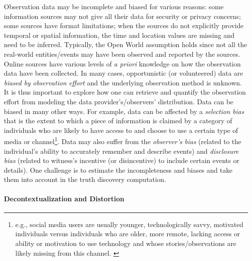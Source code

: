 \documentclass[prodmode,acmtecs]{acmsmall} %
\begin{document}
Observation data may be incomplete and biased for various reasons: 
some information sources may not give all their data for security or privacy concerns; 
some sources have format limitations; when the sources do not explicitly provide temporal 
or spatial information, the time and location values are missing and need to be inferred.
Typically, the Open World assumption holds since  not all the real-world entities/events 
may have been observed and reported by the sources. Online sources have  various levels 
of {\it a priori} knowledge on how the observation data have been collected. In many cases,
opportunistic (or volunteered) data are {\it biased by  observation effort} and the underlying
observation method is unknown. It is thus important to explore how one can retrieve and quantify
the observation effort from modeling the data provider's/observers' distribution. Data  can be biased
in many other ways. For example, data can be affected by a {\it selection bias} that is the extent to
which a piece of information is claimed by a category of individuals who are likely to have access to 
and choose to use a certain type of media or channel\footnote{\scriptsize{e.g., social media users are
usually younger, technologically savvy, motivated individuals versus individuals who are older, more remote,
lacking access or ability or motivation to use technology and whose stories/observations are likely missing 
from this channel. }}. Data may also suffer from the {\it observer's bias} (related to the individual's ability
to accurately remember and describe events) and {\it disclosure bias} (related to witness's incentive  (or disincentive) 
to  include certain events or details). One challenge is to estimate the incompleteness and biases and take them into account
in the truth discovery computation.

\paragraph*{Decontextualization and Distortion}  
\end{document}
